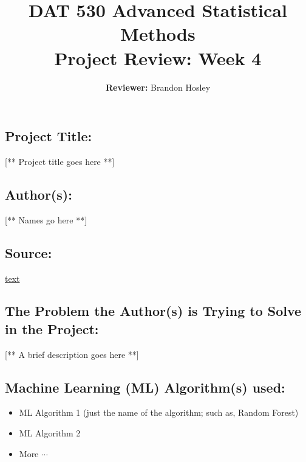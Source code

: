 \documentclass[]{article}
\title{\textbf{DAT 530 Advanced Statistical Methods}\\
	\normalsize{Project Review: Week 4} }
\author{\textbf{Reviewer: }
	Brandon Hosley}
\begin{document}
\setlength{\droptitle}{-10em} 
\pretitle{\begin{flushleft}\LARGE} %
	\posttitle{\end{flushleft}}
\preauthor{\begin{flushleft}\large} %
	\postauthor{\end{flushleft}}
\predate{\begin{flushleft}\large} %
	\postdate{\end{flushleft}}
\maketitle

\vspace{-2em}

\subsection*{Project Title:}
[** Project title goes here **]

\subsection*{Author(s):}
[** Names go here **]

\subsection*{Source:}
\href{URL}{text}

\subsection*{The Problem the Author(s) is Trying to Solve in the Project:}
[** A brief description goes here **]

\subsection*{Machine Learning (ML) Algorithm(s) used:}
\begin{itemize}
	\item ML Algorithm 1 (just the name of the algorithm; such as, Random Forest)
	\item ML Algorithm 2
	\item More $\cdots$
\end{itemize}
\end{document}

